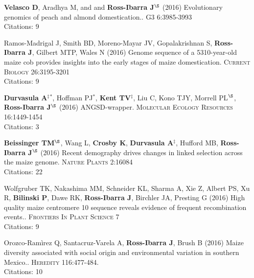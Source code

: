 \documentclass[letterpaper,10pt]{article}
\begin{document}
\begin{etaremune}
\item {\bf Velasco D}, Aradhya M, and  and {\bf Ross-Ibarra J}$^\S$ (2016) Evolutionary genomics of peach and almond domestication.. \textsc{G3} 6:3985-3993
\\Citations: 9\\

\item Ramos-Madrigal J, Smith BD, Moreno-Mayar JV, Gopalakrishnan S, {\bf Ross-Ibarra J}, Gilbert MTP, Wales N (2016) Genome sequence of a 5310-year-old maize cob provides insights into the early stages of maize domestication. \textsc{Current Biology} 26:3195-3201
\\Citations: 9\\

\item {\bf Durvasula A}$^\ddagger$$^*$,  Hoffman PJ$^*$, {\bf Kent TV}$^\ddagger$, Liu C, Kono TJY, Morrell PL$^\S$, {\bf Ross-Ibarra J}$^\S$ (2016) ANGSD-wrapper. \textsc{Molecular Ecology Resources} 16:1449-1454 %
\\Citations: 3\\

\item {\bf Beissinger TM}$^\S$, Wang L, {\bf Crosby K}, {\bf Durvasula A}$^\ddagger$, Hufford MB, {\bf Ross-Ibarra J}$^\S$ (2016)  Recent demography drives changes in linked selection across the maize genome. \textsc{Nature Plants} 2:16084
\\Citations: 22\\

\item Wolfgruber TK, Nakashima MM, Schneider KL, Sharma A, Xie Z, Albert PS, Xu R, {\bf Bilinski P},  Dawe RK, {\bf Ross-Ibarra J}, Birchler JA, Presting G (2016) High quality maize centromere 10 sequence reveals evidence of frequent recombination events.. \textsc{Frontiers In Plant Science} 7
\\Citations: 9\\

\item Orozco-Ram\`{i}rez Q, Santacruz-Varela A, {\bf Ross-Ibarra J}, Brush B (2016) Maize diversity associated with social origin and environmental variation in southern Mexico.. \textsc{Heredity} 116:477-484.
\\Citations: 10\\



\end{etaremune}
\end{document}

